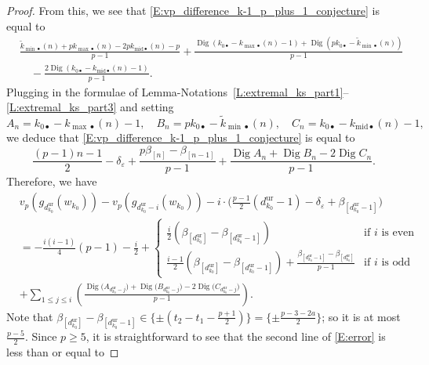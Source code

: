 \begin{proof}
    From this, we see that \eqref{E:vp_difference_k-1_p_plus_1_conjecture} is equal to
    \begin{align*}
    &\frac{\tilde k_{{\min}\bullet}(n) +pk_{{\max}\bullet}(n)- 2pk_{{{\mathrm{mid}}}\bullet}(n)-p}{p-1} + \frac{{\operatorname{Dig}}(k_{0\bullet}- k_{{\max}\bullet}(n)-1) + {\operatorname{Dig}}(pk_{0\bullet}  - \tilde k_{{\min}\bullet}(n))}{p-1}
    \\
    & \quad - \frac{2{\operatorname{Dig}}(k_{0\bullet}- k_{{{\mathrm{mid}}}\bullet}(n)-1)}{p-1}.
    \end{align*}
    Plugging in the formulae of Lemma-Notations~\ref{L:extremal_ks_part1}--\ref{L:extremal_ks_part3} and setting
    \[
    A_n = k_{0\bullet}- k_{{\max}\bullet}(n)-1, \quad B_n = pk_{0\bullet}  - \tilde k_{{\min}\bullet}(n), \quad C_n = k_{0\bullet}- k_{{{\mathrm{mid}}}\bullet}(n)-1,
    \]
    we deduce that \eqref{E:vp_difference_k-1_p_plus_1_conjecture} is equal to
    $$
    \frac{(p-1)n-1}2 - \delta_\varepsilon +\frac{p\beta_{[n]} - \beta_{[n-1]}}{p-1}
    + \frac{{\operatorname{Dig}}A_n+{\operatorname{Dig}}B_n-2{\operatorname{Dig}}C_n}{p-1}.$$
    Therefore, we have
    \begin{eqnarray}
    \label{E:error}
    &v_p(g_{d_{k_0}^{\mathrm{ur}}}(w_{k_0})) - v_p(g_{d_{k_0}^{\mathrm{ur}}-i}(w_{k_0})) -  i \cdot \big( \frac{p-1}2(d_{k_0}^{\mathrm{ur}}-1)-\delta_\varepsilon + \beta_{[d_{k_0}^{\mathrm{ur}}-1]}\big) \\
    \nonumber &
    = -\frac{i(i-1)}{4}(p-1)-\frac{i}{2}+
    \begin{cases}
    \frac{i}{2} (\beta_{[d_{k_0}^{\mathrm{ur}}]}-\beta_{[d_{k_0}^{\mathrm{ur}}-1]}) & \textrm{if $i$ is even}\\
    \frac{i-1}{2} (\beta_{[d_{k_0}^{\mathrm{ur}}]}-\beta_{[d_{k_0}^{\mathrm{ur}}-1]})+ \frac{\beta_{[d_{k_0}^{\mathrm{ur}}-1]}-\beta_{[d_{k_0}^{\mathrm{ur}}]}}{p-1} & \textrm{if $i$ is odd}
    \end{cases}\\
    \nonumber
    & + \displaystyle \sum_{1 \leq j \leq i} \left( \frac{{\operatorname{Dig}}\big(A_{d_{k_0}^{\mathrm{ur}}- j}\big) +{\operatorname{Dig}}\big(B_{d_{k_0}^{\mathrm{ur}}- j}\big) - 2 {\operatorname{Dig}}\big(C_{d_{k_0}^{\mathrm{ur}}- j}\big)}{p-1}\right).
    \end{eqnarray}
    Note that $\beta_{[d_{k_0}^{\mathrm{ur}}]}-\beta_{[d_{k_0}^{\mathrm{ur}}-1]} \in \{ \pm( t_2-t_1-\frac{p+1}{2})\} = \{\pm \frac{p-3-2a}{2}\}$; so it is at most $\frac{p-5}{2}$. Since $p\geq5$, it is straightforward to see that the second line of \eqref{E:error} is less than or equal to

\end{proof}
